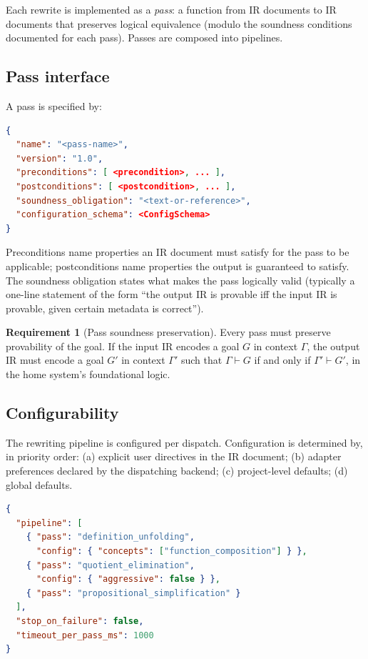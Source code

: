 \documentclass[11pt,letterpaper]{article}
\theoremstyle{definition}
\newtheorem{requirement}{Requirement}[section]
\theoremstyle{remark}
\begin{document}
Each rewrite is implemented as a \emph{pass}: a function from IR
documents to IR documents that preserves logical equivalence (modulo
the soundness conditions documented for each pass). Passes are
composed into pipelines.

\subsection{Pass interface}

A pass is specified by:

\begin{lstlisting}[language=json]
{
  "name": "<pass-name>",
  "version": "1.0",
  "preconditions": [ <precondition>, ... ],
  "postconditions": [ <postcondition>, ... ],
  "soundness_obligation": "<text-or-reference>",
  "configuration_schema": <ConfigSchema>
}
\end{lstlisting}

Preconditions name properties an IR document must satisfy for the pass
to be applicable; postconditions name properties the output is
guaranteed to satisfy. The soundness obligation states what makes the
pass logically valid (typically a one-line statement of the form ``the
output IR is provable iff the input IR is provable, given certain
metadata is correct'').

\begin{requirement}[Pass soundness preservation]
Every pass must preserve provability of the goal. If the input IR
encodes a goal $G$ in context $\Gamma$, the output IR must encode a goal
$G'$ in context $\Gamma'$ such that $\Gamma \vdash G$ if and only if
$\Gamma' \vdash G'$, in the home system's foundational logic.
\end{requirement}

\subsection{Configurability}

The rewriting pipeline is configured per dispatch. Configuration is
determined by, in priority order: (a) explicit user directives in the
IR document; (b) adapter preferences declared by the dispatching
backend; (c) project-level defaults; (d) global defaults.

\begin{lstlisting}[language=json]
{
  "pipeline": [
    { "pass": "definition_unfolding",
      "config": { "concepts": ["function_composition"] } },
    { "pass": "quotient_elimination",
      "config": { "aggressive": false } },
    { "pass": "propositional_simplification" }
  ],
  "stop_on_failure": false,
  "timeout_per_pass_ms": 1000
}
\end{lstlisting}
\end{document}
